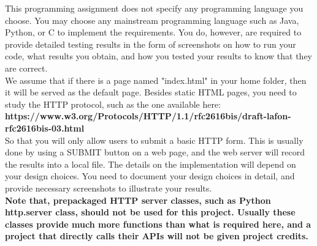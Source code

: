 This programming assignment does not specify any programming language you choose. You may choose any mainstream programming language such as Java, Python, or C to implement the requirements. You do, however, are required to provide detailed testing results in the form of screenshots on how to run your code, what results you obtain, and how you tested your results to know that they are correct. \\
We assume that if there is a page named "index.html" in your home folder, then it will be served as the default page. Besides static HTML pages, you need to study the HTTP protocol, such as the one available here: \\
\textbf{https://www.w3.org/Protocols/HTTP/1.1/rfc2616bis/draft-lafon-rfc2616bis-03.html} \\
So that you will only allow users to submit a basic HTTP form. This is usually done by using a SUBMIT button on a web page, and the web server will record the results into a local file. The details on the implementation will depend on your design choices. You need to document your design choices in detail, and provide necessary screenshots to illustrate your results. \\
\textbf{Note that, prepackaged HTTP server classes, such as Python http.server class, should not be used for this project. Usually these classes provide much more functions than what is required here, and a project that directly calls their APIs will not be given project credits.} 
